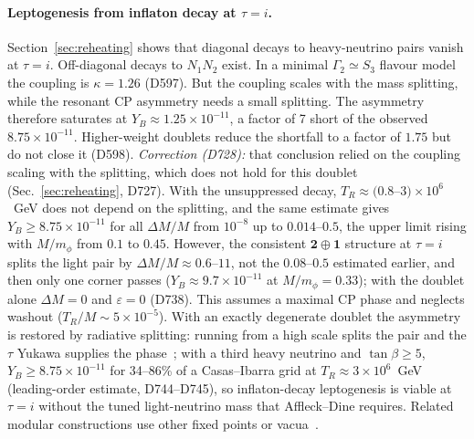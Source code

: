 \documentclass[aps,prd,twocolumn,superscriptaddress,nofootinbib,floatfix]{revtex4-2}
\begin{document}
\paragraph{Leptogenesis from inflaton decay at $\tau=i$.} Section~\ref{sec:reheating} shows that diagonal decays to heavy-neutrino pairs vanish at $\tau = i$. Off-diagonal decays to $N_1N_2$ exist. In a minimal $\Gamma_2 \simeq S_3$ flavour model the coupling is $\kappa = 1.26$ (D597). But the coupling scales with the mass splitting, while the resonant CP asymmetry needs a small splitting. The asymmetry therefore saturates at $Y_B \approx 1.25\times10^{-11}$, a factor of 7 short of the observed $8.75\times10^{-11}$. Higher-weight doublets reduce the shortfall to a factor of $1.75$ but do not close it (D598). \emph{Correction (D728):} that conclusion relied on the coupling scaling with the splitting, which does not hold for this doublet (Sec.~\ref{sec:reheating}, D727). With the unsuppressed decay, $T_R\approx(0.8$--$3)\times10^6$~GeV does not depend on the splitting, and the same estimate gives $Y_B\ge8.75\times10^{-11}$ for all $\Delta M/M$ from $10^{-8}$ up to $0.014$--$0.5$, the upper limit rising with $M/m_\phi$ from $0.1$ to $0.45$. However, the consistent $\mathbf2\oplus\mathbf1$ structure at $\tau=i$ splits the light pair by $\Delta M/M\approx0.6$--$11$, not the $0.08$--$0.5$ estimated earlier, and then only one corner passes ($Y_B\approx9.7\times10^{-11}$ at $M/m_\phi=0.33$); with the doublet alone $\Delta M=0$ and $\varepsilon=0$ (D738). This assumes a maximal CP phase and neglects washout ($T_R/M\sim5\times10^{-5}$). With an exactly degenerate doublet the asymmetry is restored by radiative splitting: running from a high scale splits the pair and the $\tau$ Yukawa supplies the phase~\cite{BrancoRadLepto2005}; with a third heavy neutrino and $\tan\beta\ge5$, $Y_B\ge8.75\times10^{-11}$ for 34--86\% of a Casas--Ibarra grid at $T_R\approx3\times10^6$~GeV (leading-order estimate, D744--D745), so inflaton-decay leptogenesis is viable at $\tau=i$ without the tuned light-neutrino mass that Affleck--Dine requires. Related modular constructions use other fixed points or vacua~\cite{arXiv_2411_18603,arXiv_2604_04585}.
\end{document}
